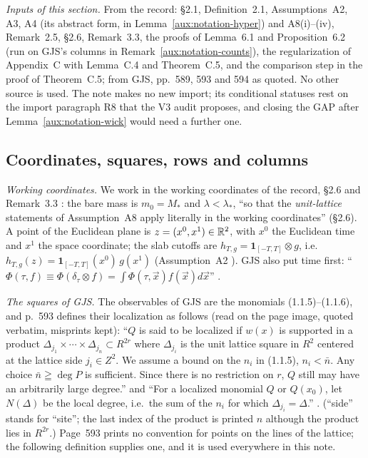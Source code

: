 \emph{Inputs of this section.}  From the record: \S2.1, Definition~2.1, Assumptions~A2, A3, A4
(its abstract form, in Lemma~\ref{aux:notation-hyper}) and A8(i)--(iv), Remark~2.5, \S2.6,
Remark~3.3, the proofs of Lemma~6.1 and Proposition~6.2 (run on GJS's columns in
Remark~\ref{aux:notation-counts}), the regularization of Appendix~C with Lemma~C.4 and
Theorem~C.5, and the comparison step in the proof of Theorem~C.5; from GJS, pp.~589, 593 and 594
as quoted.  No other source is used.  The note makes no new import; its conditional statuses rest
on the import paragraph R8 that the V3 audit proposes, and closing the GAP after
Lemma~\ref{aux:notation-wick} would need a further one.

\subsection{Coordinates, squares, rows and columns}\label{sec:notation-squares}

\emph{Working coordinates.}  We work in the working coordinates of the record, \S2.6
\cite[p.~14]{R} and Remark~3.3 \cite[p.~16]{R}: the bare mass is $m_0=M_*$ and
$\lambda<\lambda_*$, ``so that the \emph{unit-lattice} statements of Assumption~A8 apply
literally in the working coordinates'' (\S2.6).  A point of the Euclidean plane is
$z=(x^0,x^1)\in\mathbb{R}^2$, with $x^0$ the Euclidean time and $x^1$ the space coordinate; the
slab cutoffs are $h_{T,g}=\mathbf 1_{[-T,T]}\otimes g$, i.e.\
$h_{T,g}(z)=\mathbf 1_{[-T,T]}(x^0)\,g(x^1)$ (Assumption~A2 \cite[p.~8]{R}).  GJS also put
time first: ``$\Phi(\tau,f)\equiv\Phi(\delta_\tau\otimes f)=\int\Phi(\tau,\vec x)f(\vec
x)d\vec x$'' \cite[p.~589]{GJS}.

\emph{The squares of GJS.}  The observables of GJS are the monomials (1.1.5)--(1.1.6), and
p.~593 defines their localization as follows (read on the page image, quoted verbatim,
misprints kept): ``$Q$ is said to be localized if $w(x)$ is supported in a product
$\Delta_{j_1}\times\cdots\times\Delta_{j_n}\subset R^{2r}$ where $\Delta_{j_i}$ is the unit
lattice square in $R^2$ centered at the lattice side $j_i\in Z^2$. We assume a bound on the
$n_i$ in (1.1.5), $n_i<\bar n$. Any choice $\bar n\geqq\deg P$ is sufficient. Since there is
no restriction on $r$, $Q$ still may have an arbitrarily large degree.'' and ``For a
localized monomial $Q$ or $Q(x_0)$, let $N(\Delta)$ be the local degree, i.e.\ the sum of
the $n_i$ for which $\Delta_{j_i}=\Delta$.'' \cite[p.~593]{GJS}.  (``side'' stands for
``site''; the last index of the product is printed $n$ although the product lies in
$R^{2r}$.)  Page~593 prints no convention for points on the lines of the lattice; the
following definition supplies one, and it is used everywhere in this note.

